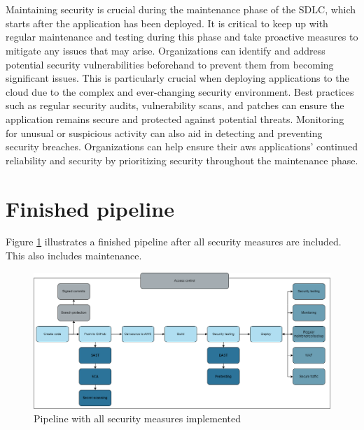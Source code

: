 \\~\\
Maintaining security is crucial during the maintenance phase of the SDLC, which starts after the application has been deployed. It is critical to keep up with regular maintenance and testing during this phase and take proactive measures to mitigate any issues that may arise. Organizations can identify and address potential security vulnerabilities beforehand to prevent them from becoming significant issues. This is particularly crucial when deploying applications to the cloud due to the complex and ever-changing security environment. Best practices such as regular security audits, vulnerability scans, and patches can ensure the application remains secure and protected against potential threats. Monitoring for unusual or suspicious activity can also aid in detecting and preventing security breaches. Organizations can help ensure their \acrshort{aws} applications' continued reliability and security by prioritizing security throughout the maintenance phase.


\section{Finished pipeline}
Figure \ref{fig: Pipeline with all security measures implemented} illustrates a finished pipeline after all security measures are included. This also includes maintenance.  

\vspace{2mm}
\begin{figure}[H]
    \centering
    \includegraphics[width=0.8\columnwidth]{Images/FinalPipeline.png}
    \caption{Pipeline with all security measures implemented}
    \label{fig: Pipeline with all security measures implemented}
\end{figure}



